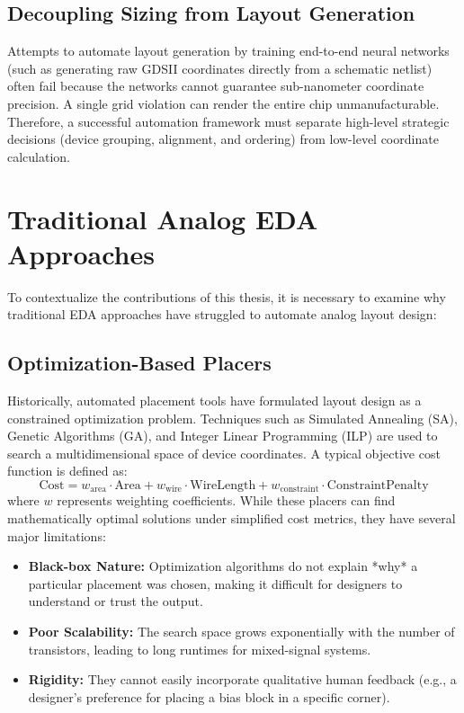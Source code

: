 \subsection{Decoupling Sizing from Layout Generation}
Attempts to automate layout generation by training end-to-end neural networks (such as generating raw GDSII coordinates directly from a schematic netlist) often fail because the networks cannot guarantee sub-nanometer coordinate precision. A single grid violation can render the entire chip unmanufacturable. Therefore, a successful automation framework must separate high-level strategic decisions (device grouping, alignment, and ordering) from low-level coordinate calculation.

\section{Traditional Analog EDA Approaches}
\label{sec:traditional_eda}

To contextualize the contributions of this thesis, it is necessary to examine why traditional EDA approaches have struggled to automate analog layout design:

\subsection{Optimization-Based Placers}
Historically, automated placement tools have formulated layout design as a constrained optimization problem. Techniques such as Simulated Annealing (SA), Genetic Algorithms (GA), and Integer Linear Programming (ILP) are used to search a multidimensional space of device coordinates. A typical objective cost function is defined as:
\begin{equation}
    \text{Cost} = w_{\text{area}} \cdot \text{Area} + w_{\text{wire}} \cdot \text{WireLength} + w_{\text{constraint}} \cdot \text{ConstraintPenalty}
\end{equation}
where $w$ represents weighting coefficients.
While these placers can find mathematically optimal solutions under simplified cost metrics, they have several major limitations:
\begin{itemize}
    \item \textbf{Black-box Nature:} Optimization algorithms do not explain *why* a particular placement was chosen, making it difficult for designers to understand or trust the output.
    \item \textbf{Poor Scalability:} The search space grows exponentially with the number of transistors, leading to long runtimes for mixed-signal systems.
    \item \textbf{Rigidity:} They cannot easily incorporate qualitative human feedback (e.g., a designer's preference for placing a bias block in a specific corner).
\end{itemize}

